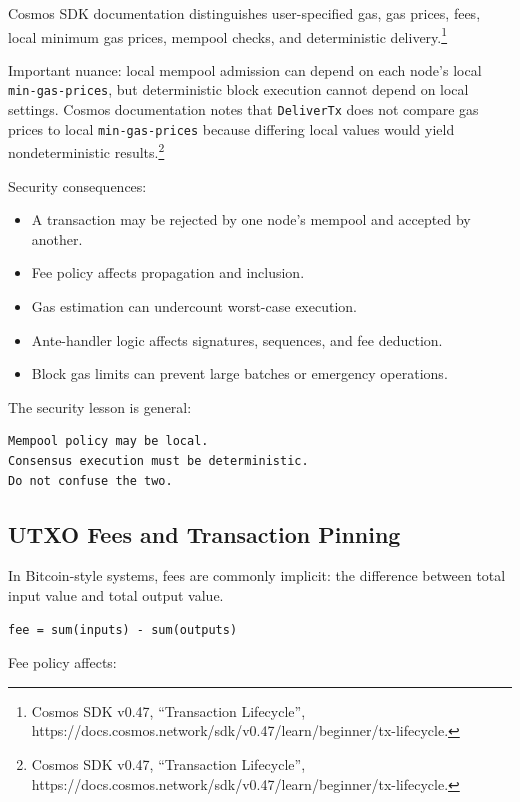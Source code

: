 Cosmos SDK documentation distinguishes user-specified gas, gas prices,
fees, local minimum gas prices, mempool checks, and deterministic
delivery.\footnote{Cosmos SDK v0.47, ``Transaction Lifecycle'',
  https://docs.cosmos.network/sdk/v0.47/learn/beginner/tx-lifecycle.}

Important nuance: local mempool admission can depend on each node's
local \passthrough{\lstinline!min-gas-prices!}, but deterministic block
execution cannot depend on local settings. Cosmos documentation notes
that \passthrough{\lstinline!DeliverTx!} does not compare gas prices to
local \passthrough{\lstinline!min-gas-prices!} because differing local
values would yield nondeterministic results.\footnote{Cosmos SDK v0.47,
  ``Transaction Lifecycle'',
  https://docs.cosmos.network/sdk/v0.47/learn/beginner/tx-lifecycle.}

Security consequences:

\begin{itemize}
\tightlist
\item
  A transaction may be rejected by one node's mempool and accepted by
  another.
\item
  Fee policy affects propagation and inclusion.
\item
  Gas estimation can undercount worst-case execution.
\item
  Ante-handler logic affects signatures, sequences, and fee deduction.
\item
  Block gas limits can prevent large batches or emergency operations.
\end{itemize}

The security lesson is general:

\begin{lstlisting}
Mempool policy may be local.
Consensus execution must be deterministic.
Do not confuse the two.
\end{lstlisting}

\subsection{UTXO Fees and Transaction Pinning}

In Bitcoin-style systems, fees are commonly implicit: the difference
between total input value and total output value.

\begin{lstlisting}
fee = sum(inputs) - sum(outputs)
\end{lstlisting}

Fee policy affects:

